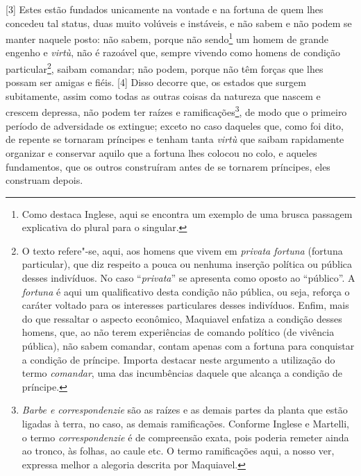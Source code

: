 {[}3{]} Estes estão fundados unicamente na vontade e na fortuna de quem
lhes concedeu tal status, duas muito volúveis e instáveis, e não sabem e
não podem se manter naquele posto: não sabem, porque não sendo\footnote{Como
  destaca Inglese, aqui se encontra um exemplo de uma brusca passagem
  explicativa do plural para o singular.} um homem de grande engenho e
\emph{virtù}, não é razoável que, sempre vivendo como homens de condição
particular\footnote{O texto refere"-se, aqui, aos homens que vivem em
  \emph{privata fortuna} (fortuna particular), que diz respeito a pouca
  ou nenhuma inserção política ou pública desses indivíduos. No caso
  ``\emph{privata}'' se apresenta como oposto ao ``público''. A
  \emph{fortuna} é aqui um qualificativo desta condição não pública, ou
  seja, reforça o caráter voltado para os interesses particulares desses
  indivíduos. Enfim, mais do que ressaltar o aspecto econômico,
  Maquiavel enfatiza a condição desses homens, que, ao não terem
  experiências de comando político (de vivência pública), não sabem
  comandar, contam apenas com a fortuna para conquistar a condição de
  príncipe. Importa destacar neste argumento a utilização do termo
  \emph{comandar}, uma das incumbências daquele que alcança a condição
  de príncipe.}, saibam comandar; não podem, porque não têm forças que
lhes possam ser amigas e fiéis. {[}4{]} Disso decorre que, os estados
que surgem subitamente, assim como todas as outras coisas da natureza
que nascem e crescem depressa, não podem ter raízes e
ramificações\footnote{\emph{Barbe e correspondenzie} são as raízes e as
  demais partes da planta que estão ligadas à terra, no caso, as demais
  ramificações. Conforme Inglese e Martelli, o termo
  \emph{correspondenzie} é de compreensão exata, pois poderia remeter
  ainda ao tronco, às folhas, ao caule etc. O termo ramificações aqui, a
  nosso ver, expressa melhor a alegoria descrita por Maquiavel.}, de
modo que o primeiro período de adversidade os extingue; exceto no caso
daqueles que, como foi dito, de repente se tornaram príncipes e tenham
tanta \emph{virtù} que saibam rapidamente organizar e conservar aquilo
que a fortuna lhes colocou no colo, e aqueles fundamentos, que os outros
construíram antes de se tornarem príncipes, eles construam depois.

